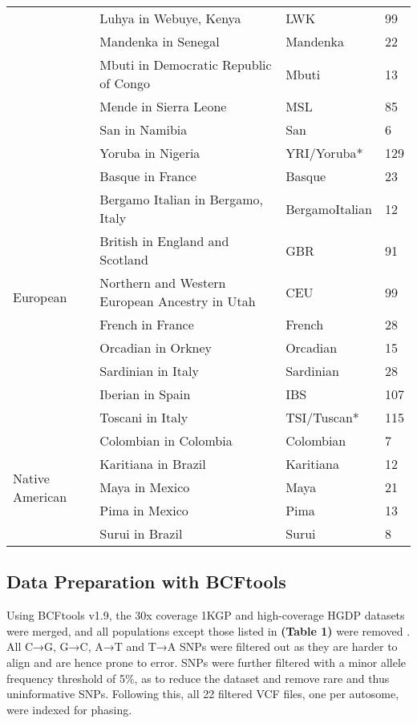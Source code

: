 \documentclass[11pt]{article}
\begin{document}
\begin{table}[htb]
\begin{tabular}{ |p{3cm}||p{8cm}|p{3cm}|p{0.8cm}|  }
        &Luhya in Webuye, Kenya & LWK & 99 \\
        &Mandenka in Senegal & Mandenka & 22 \\
        &Mbuti in Democratic Republic of Congo & Mbuti & 13 \\
        &Mende in Sierra Leone & MSL & 85 \\
        &San in Namibia & San & 6 \\
        &Yoruba in Nigeria & YRI/Yoruba* & 129 \\
    \hline
    \multirow{9}{*}{European}
        &Basque in France & Basque & 23 \\
        &Bergamo Italian in Bergamo, Italy & BergamoItalian & 12 \\
        &British in England and Scotland & GBR & 91 \\
        &Northern and Western European Ancestry in Utah & CEU & 99 \\
        &French in France & French & 28 \\
        &Orcadian in Orkney & Orcadian & 15 \\
        &Sardinian in Italy & Sardinian & 28 \\
        &Iberian in Spain & IBS & 107 \\
        &Toscani in Italy & TSI/Tuscan* & 115 \\
    \hline
    \multirow{5}{*}{Native American}
        &Colombian in Colombia & Colombian & 7 \\
        &Karitiana in Brazil & Karitiana & 12 \\
        &Maya in Mexico & Maya & 21 \\
        &Pima in Mexico & Pima & 13 \\
        &Surui in Brazil & Surui & 8 \\
    \hline
    \end{tabular}
\end{table}





\subsection{Data Preparation with BCFtools}

Using BCFtools v1.9, the 30x coverage 1KGP and high-coverage HGDP datasets were merged, and all populations except those listed in \textbf{(Table 1)} were removed \parencite{Danecek2021}. All C→G, G→C, A→T and T→A SNPs were filtered out as they are harder to align and are hence prone to error. SNPs were further filtered with a minor allele frequency threshold of 5\%, as to reduce the dataset and remove rare and thus uninformative SNPs. Following this, all 22 filtered VCF files, one per autosome, were indexed for phasing. 
\end{document}
